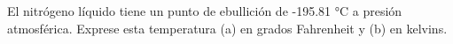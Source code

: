 \item El nitrógeno líquido tiene un punto de ebullición de -195.81 °C a presión atmosférica. Exprese esta temperatura (a) en grados Fahrenheit y (b) en kelvins.
